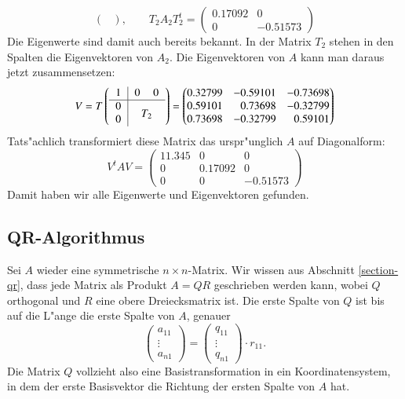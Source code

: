 \begin{beispiel}
\[\begin{pmatrix}
\end{pmatrix},\qquad
T_2A_2T_2^t=
\begin{pmatrix}
   0.17092&        0\\
         0& -0.51573
\end{pmatrix}
\]
Die Eigenwerte sind damit auch bereits bekannt.
In der Matrix $T_2$ stehen in den Spalten die Eigenvektoren
von $A_2$.
Die Eigenvektoren von $A$ kann man daraus jetzt zusammensetzen:
\[
V=
T\left(
\begin{tabular}{>{$}c<{$}|>{$}c<{$}>{$}c<{$}}
1&0&0\\
\hline
0&\multicolumn{2}{c}{\raisebox{-1.5ex}[0cm][0cm]{$T_2$}}\\
0
\end{tabular}
\right)
=\begin{pmatrix}
   0.32799&            -0.59101&           -0.73698\\
   0.59101& \phantom{-} 0.73698&           -0.32799\\
   0.73698&            -0.32799& \phantom{-}0.59101
\end{pmatrix}
\]
Tats"achlich transformiert diese Matrix das urspr"unglich $A$ auf
Diagonalform:
\[
V^tAV=\begin{pmatrix}
11.345&0&0\\
0&0.17092&0\\
0&0&-0.51573
\end{pmatrix}
\]
Damit haben wir alle Eigenwerte und Eigenvektoren gefunden.
\end{beispiel}

\subsection{QR-Algorithmus}
Sei $A$ wieder eine symmetrische $n\times n$-Matrix.
Wir wissen aus
Abschnitt \ref{section-qr}, dass jede Matrix als Produkt $A=QR$
geschrieben werden kann, wobei $Q$ orthogonal und $R$ eine obere
Dreiecksmatrix ist.
Die erste Spalte von $Q$ ist bis auf die L"ange die erste Spalte
von $A$, genauer
\[
\begin{pmatrix}a_{11}\\\vdots\\a_{n1} \end{pmatrix}
=
\begin{pmatrix}q_{11}\\\vdots\\q_{n1} \end{pmatrix}\cdot r_{11}.
\]
Die Matrix $Q$ vollzieht also eine Basistransformation
in ein Koordinatensystem, in dem der erste Basisvektor die Richtung
der ersten Spalte von $A$ hat.

